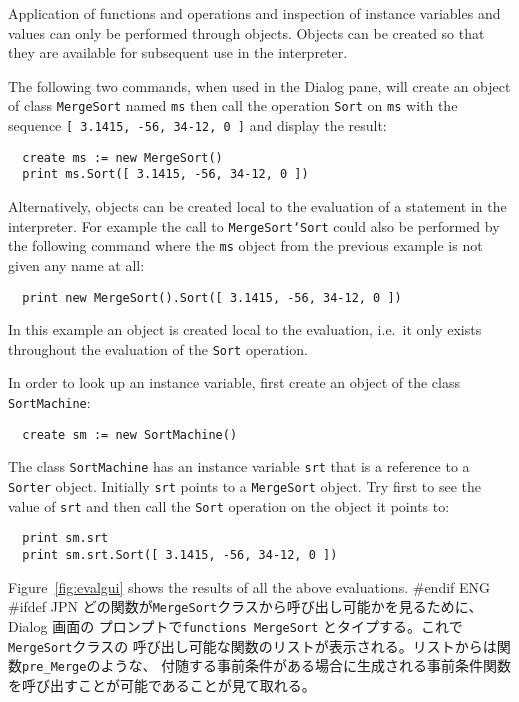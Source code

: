 \documentclass[\pformat,12pt]{article}
\newcommand{\aaa}{\tt }
\newcommand{\cmd}{\tt }
\newcommand{\guicmd}[1]{{\sf #1}}
\newcommand{\guicmd}[1]{{\gt #1}}
\begin{document}
Application of functions and operations and inspection of instance
variables and values can only be performed through objects.  Objects
can be created so that they are available for subsequent use in the
interpreter.

The following two commands, when used in the \guicmd{Dialog} pane, will
create an object of class {\aaa MergeSort} named {\aaa ms} then call
the operation {\tt Sort} on {\tt ms} with the sequence {\tt [ 3.1415,
  -56, 34-12, 0 ]} and display the result:

\begin{verbatim}
  create ms := new MergeSort()
  print ms.Sort([ 3.1415, -56, 34-12, 0 ])
\end{verbatim}

Alternatively, objects can 
be created local to the evaluation of a statement in the interpreter.
 For example the call to {\tt MergeSort`Sort}
could also be performed by the following command where the {\tt ms}
object from the previous example is not given any name at all:

\begin{verbatim}
  print new MergeSort().Sort([ 3.1415, -56, 34-12, 0 ])
\end{verbatim}

In this example an object is created local to the evaluation, i.e.\ 
it only exists throughout the evaluation of the {\tt Sort} operation.

In order to look up an instance variable, first create an object of
the class {\tt SortMachine}:

\begin{verbatim}
  create sm := new SortMachine()
\end{verbatim}

The class {\tt SortMachine} has an instance variable {\tt srt} that is
a reference to a {\tt Sorter} object.  Initially {\tt srt} points
to a {\tt MergeSort} object.  Try first to see the value of {\tt srt}
and then call the {\tt Sort} operation on the object it points to:

\begin{verbatim}
  print sm.srt
  print sm.srt.Sort([ 3.1415, -56, 34-12, 0 ])
\end{verbatim}

Figure~\ref{fig:evalgui} shows the results of all the above
evaluations.
#endif ENG
#ifdef JPN
どの関数が{\aaa MergeSort}クラスから呼び出し可能かを見るために、\guicmd{Dialog} 画面の
プロンプトで{\cmd functions MergeSort} とタイプする。これで{\aaa MergeSort}クラスの
呼び出し可能な関数のリストが表示される。リストからは関数{\aaa pre\_Merge}のような、
付随する事前条件がある場合に生成される事前条件関数
を呼び出すことが可能であることが見て取れる。
\end{document}
